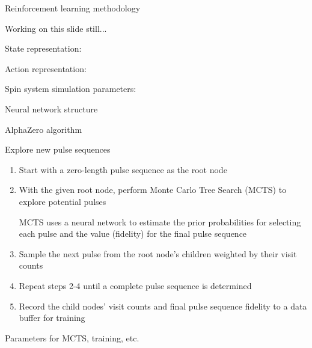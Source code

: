 \documentclass{beamer}
\begin{document}
\begin{frame}{Reinforcement learning methodology}


Working on this slide still...

State representation:

Action representation:

Spin system simulation parameters:


\end{frame}

\begin{frame}{Neural network structure}

\begin{figure}
\centering
\scalebox{.6}{

}
\end{figure}

\end{frame}

\begin{frame}{AlphaZero algorithm}


Explore new pulse sequences

\begin{enumerate}

\item
Start with a zero-length pulse sequence as the root node
\item
With the given root node, perform Monte Carlo Tree Search (MCTS) to
explore potential pulses

MCTS uses a neural network to estimate the prior probabilities for
selecting each pulse and the value (fidelity) for the final pulse
sequence

\item
Sample the next pulse from the root node's children weighted by
their visit counts
\item
Repeat steps 2-4 until a complete pulse sequence is determined
\item
Record the child nodes' visit counts and final pulse sequence
fidelity to a data buffer for training
\end{enumerate}

Parameters for MCTS, training, etc.
\end{frame}
\end{document}
